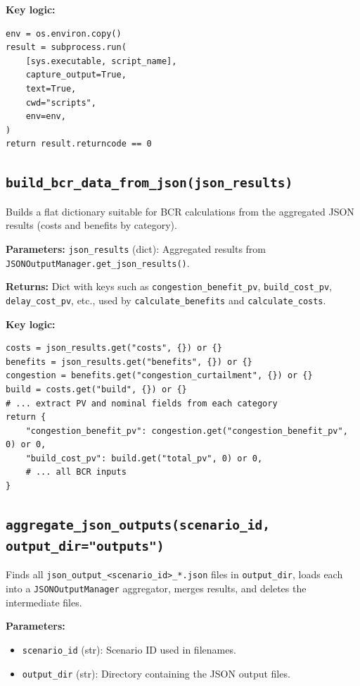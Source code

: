 \documentclass[ctcc_full_documentation.tex]{subfiles}
\begin{document}
\textbf{Key logic:}
\begin{lstlisting}
env = os.environ.copy()
result = subprocess.run(
    [sys.executable, script_name],
    capture_output=True,
    text=True,
    cwd="scripts",
    env=env,
)
return result.returncode == 0
\end{lstlisting}

\subsection{\texttt{build\_bcr\_data\_from\_json(json\_results)}}

Builds a flat dictionary suitable for BCR calculations from the aggregated JSON results (costs and benefits by category).

\textbf{Parameters:} \texttt{json\_results} (dict): Aggregated results from \texttt{JSONOutputManager.get\_json\_results()}.

\textbf{Returns:} Dict with keys such as \texttt{congestion\_benefit\_pv}, \texttt{build\_cost\_pv}, \texttt{delay\_cost\_pv}, etc., used by \texttt{calculate\_benefits} and \texttt{calculate\_costs}.

\textbf{Key logic:}
\begin{lstlisting}
costs = json_results.get("costs", {}) or {}
benefits = json_results.get("benefits", {}) or {}
congestion = benefits.get("congestion_curtailment", {}) or {}
build = costs.get("build", {}) or {}
# ... extract PV and nominal fields from each category
return {
    "congestion_benefit_pv": congestion.get("congestion_benefit_pv", 0) or 0,
    "build_cost_pv": build.get("total_pv", 0) or 0,
    # ... all BCR inputs
}
\end{lstlisting}

\subsection{\texttt{aggregate\_json\_outputs(scenario\_id, output\_dir="outputs")}}

Finds all \texttt{json\_output\_<scenario\_id>\_*.json} files in \texttt{output\_dir}, loads each into a \texttt{JSONOutputManager} aggregator, merges results, and deletes the intermediate files.

\textbf{Parameters:}
\begin{itemize}
    \item \texttt{scenario\_id} (str): Scenario ID used in filenames.
    \item \texttt{output\_dir} (str): Directory containing the JSON output files.
\end{itemize}
\end{document}
